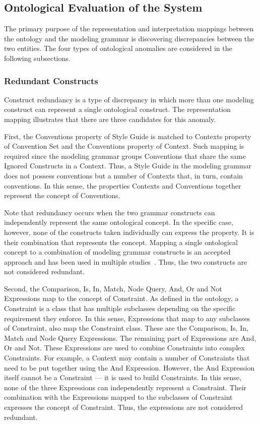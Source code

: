 \subsection{Ontological Evaluation of the System}

The primary purpose of the representation and interpretation mappings between
the ontology and the modeling grammar is discovering discrepancies between the
two entities. The four types of ontological anomalies are considered in the
following subsections.

\subsubsection{Redundant Constructs} 

Construct redundancy is a type of discrepancy in which more than one modeling
construct can represent a single ontological construct. The representation
mapping illustrates that there are three candidates for this anomaly.

First, the Conventions property of Style Guide is matched to Contexts property
of Convention Set and the Conventions property of Context. Such mapping is
required since the modeling grammar groups Conventions that share the same
Ignored Constructs in a Context. Thus, a Style Guide in the modeling grammar
does not possess conventions but a number of Contexts that, in turn, contain
conventions. In this sense, the properties Contexts and Conventions together
represent the concept of Conventions.

Note that redundancy occurs when the two grammar constructs can independently
represent the same ontological concept. In the specific case, however, none of
the constructs taken individually can express the property. It is their
combination that represents the concept. Mapping a single ontological concept
to a combination of modeling grammar constructs is an accepted approach and
has been used in multiple studies~\cite{gehlert2007toward}. Thus, the two
constructs are not considered redundant.

Second, the Comparison, Is, In, Match, Node Query, And, Or and Not Expressions
map to the concept of Constraint. As defined in the ontology, a Constraint is
a class that has multiple subclasses depending on the specific requirement
they enforce. In this sense, Expressions that map to any subclasses of
Constraint, also map the Constraint class. These are the Comparison, Is, In,
Match and Node Query Expressions. The remaining part of Expressions are And,
Or and Not. These Expressions are used to combine Constraints into complex
Constraints. For example, a Context may contain a number of Constraints that
need to be put together using the And Expression. However, the And Expression
itself cannot be a Constraint --- it is used to build Constraints. In this
sense, none of the three Expressions can independently represent a Constraint.
Their combination with the Expressions mapped to the subclasses of Constraint
expresses the concept of Constraint. Thus, the expressions are not considered
redundant.

